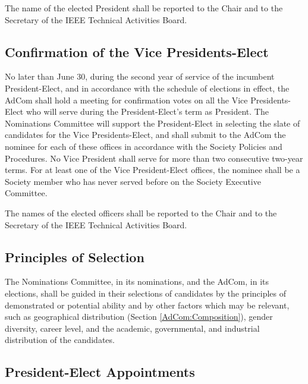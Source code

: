 \documentclass[10pt]{article}
\newcommand{\secref}[1]{Section \ref{#1}}
\begin{document}
The name of the elected President shall be reported to the Chair and to the Secretary of the IEEE Technical Activities Board.

\subsection{ Confirmation of the Vice Presidents-Elect}

No later than June 30, during the second year of service of the incumbent President-Elect, and in accordance with the schedule of elections in effect, the AdCom shall hold a meeting for confirmation votes on all the Vice Presidents-Elect who will serve during the President-Elect's term as President. The Nominations Committee will support the President-Elect in selecting the slate of candidates for the Vice Presidents-Elect, and shall submit to the AdCom the nominee for each of these offices in accordance with the Society Policies and Procedures. No Vice President shall serve for more than two consecutive two-year terms. For at least one of the Vice President-Elect offices, the nominee shall be a Society member who has never served before on the Society Executive Committee. 

The names of the elected officers shall be reported to the Chair and to the Secretary of the IEEE Technical Activities Board.

\subsection{Principles of Selection}

The Nominations Committee, in its nominations, and the AdCom, in its elections, shall be guided in their selections of candidates by the principles of demonstrated or potential ability and by other factors which may be relevant, such as geographical distribution (\secref{AdCom:Composition}), gender diversity, career level, and the academic, governmental, and industrial distribution of the candidates.  


\subsection{President-Elect Appointments}
\end{document}
